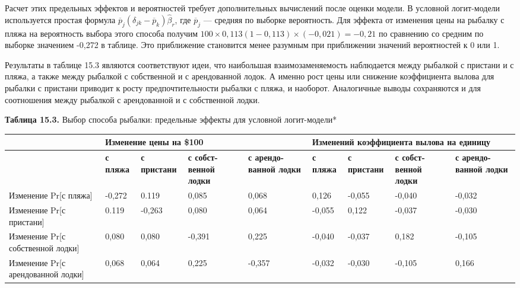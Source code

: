 Расчет этих предельных эффектов и вероятностей требует дополнительных вычислений после оценки модели. В  условной логит-модели используется простая формула ${\overline{p}}_j\left({\delta }_{jk}-{\overline{p}}_k\right){\widehat{\beta }}_r$, где ${\overline{p}}_j$ --- средняя по выборке вероятность. Для эффекта от изменения цены на рыбалку с пляжа на вероятность выбора этого способа получим $100\times 0,113\left(1-0,113\right)\times \left(-0,021\right)=-0,21$ по сравнению со средним по выборке значением -0,272 в таблице. Это приближение становится менее разумным при приближении значений вероятностей к 0 или 1.

Результаты в таблице 15.3 являются соответствуют идеи, что наибольшая взаимозаменяемость наблюдается между рыбалкой с пристани и с пляжа, а также между рыбалкой с собственной и с арендованной лодок. А именно рост цены или снижение коэффициента вылова для рыбалки с пристани приводит к росту предпочтительности рыбалки с пляжа, и наоборот. Аналогичные выводы сохраняются и для соотношения между рыбалкой с арендованной и с собственной лодки.

\textbf{Таблица 15.3. }Выбор способа рыбалки: предельные эффекты для условной логит-модели*

\begin{tabular}{|p{0.7in}|p{0.4in}|p{0.5in}|p{0.5in}|p{0.6in}|p{0.4in}|p{0.5in}|p{0.5in}|p{0.6in}|} \hline 
 & \multicolumn{4}{|p{2.0in}|}{\textbf{Изменение цены на \$100}} & \multicolumn{4}{|p{2.0in}|}{\textbf{Изменений коэффициента вылова на единицу}} \\ \hline 
 & \textbf{с пляжа} & \textbf{с пристани} & \textbf{с собст-венной лодки} & \textbf{с арендо-\newline ванной лодки} & \textbf{с пляжа} & \textbf{с пристани} & \textbf{с собст-венной лодки} & \textbf{с арендо-ванной лодки} \\ \hline 
Изменение Pr[с пляжа] & -0,272 & 0.119 & 0,085 & 0,068 & 0,126 & -0,055 & -0,040 & -0,032 \\ \hline 
Изменение Pr[с пристани] & 0.119 & -0,263 & 0,080 & 0,064 & -0,055 & 0,122 & -0,037 & -0,030 \\ \hline 
Изменение Pr[с собственной лодки] & 0,080 & 0,080 & -0,391 & 0,225 & -0,040 & -0,037 & 0,182 & -0,105 \\ \hline 
Изменение Pr[с арендованной лодки] & 0,068 & 0,064 & 0,225 & -0,357 & -0,032 & -0,030 & -0,105 & 0,166 \\ \hline 
\end{tabular}

